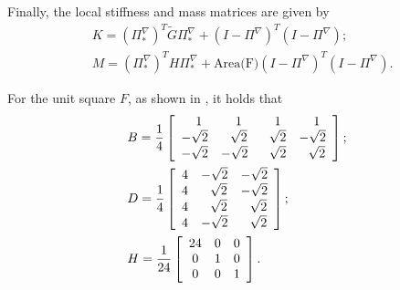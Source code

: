 \documentclass[a4paper]{article}
\begin{document}
\noindent
Finally, the local stiffness and mass matrices are given by
\begin{align}
&K = (\Pi^\nabla_*)^T \widetilde{G} \Pi^\nabla_* + (I-\Pi^\nabla)^T(I-\Pi^\nabla);\\
&M = (\Pi^\nabla_*)^T H \Pi^\nabla_* + \text{Area(F)}(I-\Pi^\nabla)^T(I-\Pi^\nabla).
\end{align}

\noindent
For the unit square $F$,  as shown in \cite{hitchhikers}, it holds that
\begin{align}
&B = \frac{1}{4}\left[\begin{array}{c c c c}
\ \ 1 & \ \ 1 & \ \ 1 & \ \ 1\\
-\sqrt{2} & \ \ \sqrt{2} & \ \ \sqrt{2} & -\sqrt{2}\\
-\sqrt{2} & -\sqrt{2} & \ \ \sqrt{2} & \ \ \sqrt{2}
\end{array}\right];\\
%
&D = \frac{1}{4}\left[\begin{array}{c c c}
4 & -\sqrt{2} & -\sqrt{2}\\
4 & \ \ \sqrt{2} & -\sqrt{2}\\
4 & \ \ \sqrt{2} & \ \ \sqrt{2}\\
4 & -\sqrt{2} & \ \ \sqrt{2}\\
\end{array}\right];\\
%
&H = \frac{1}{24}\left[\begin{array}{c c c}
24 & 0 & 0\\
0 & 1 & 0\\
0 & 0 & 1\\
\end{array}\right].
\end{align}
\end{document}
